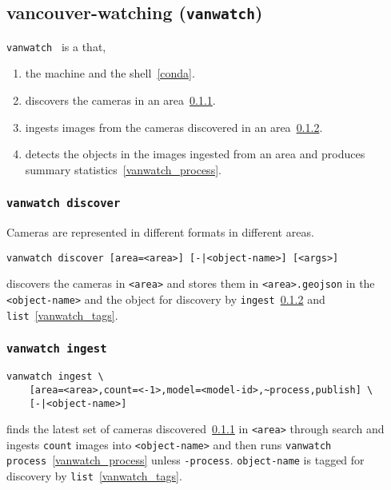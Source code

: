 \subsection{vancouver-watching (\texttt{vanwatch})}\label{vanwatch}

\texttt{vanwatch}~\cite{vanwatch} is a \kCallable that,
%
\begin{enumerate}
    \item{ the machine and the shell~\ref{conda}.}
    \item{discovers the cameras in an area~\ref{vanwatch_discover}.}
    \item{ingests images from the cameras discovered in an area~\ref{vanwatch_ingest}.}
    \item{detects the objects in the images ingested from an area and produces summary statistics~\ref{vanwatch_process}.}
\end{enumerate}

\subsubsection{\texttt{vanwatch discover}}\label{vanwatch_discover}

Cameras are represented in different formats in different areas.
%
\begin{verbatim}
vanwatch discover [area=<area>] [-|<object-name>] [<args>]
\end{verbatim}
%
discovers the cameras in \texttt{<area>} and stores them in \texttt{<area>.geojson} in the  \texttt{<object-name>} and  the object for discovery by \texttt{ingest}~\ref{vanwatch_ingest} and \texttt{list}~\ref{vanwatch_tags}. 

\subsubsection{\texttt{vanwatch ingest}}\label{vanwatch_ingest}

\begin{verbatim}
vanwatch ingest \
    [area=<area>,count=<-1>,model=<model-id>,~process,publish] \
    [-|<object-name>]
\end{verbatim}
%
finds the latest set of cameras discovered~\ref{vanwatch_discover} in \texttt{<area>} through  search and ingests \texttt{count} images into \texttt{<object-name>} and then runs \texttt{vanwatch process}~\ref{vanwatch_process} unless \texttt{-process}. \texttt{object-name} is tagged for discovery by \texttt{list}~\ref{vanwatch_tags}. 

